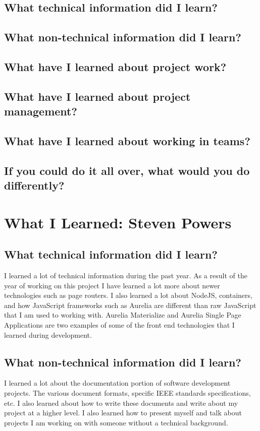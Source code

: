 \documentclass[onecolumn, draftclsnofoot,10pt, compsoc]{IEEEtran}
\begin{document}
\subsection{What technical information did I learn?}

\subsection{What non-technical information did I learn?}

\subsection{What have I learned about project work?}

\subsection{What have I learned about project management?}

\subsection{What have I learned about working in teams?}

\subsection{If you could do it all over, what would you do differently?}


\newpage
\section{What I Learned: Steven Powers}

\subsection{What technical information did I learn?}
I learned a lot of technical information during the past year. As a result of the year of working on this project I have learned a lot more about newer technologies such as page routers. I also learned a lot about NodeJS, containers, and how JavaScript frameworks such as Aurelia are different than raw JavaScript that I am used to working with. Aurelia Materialize and Aurelia Single Page Applications are two examples of some of the front end technologies that I learned during development.

\subsection{What non-technical information did I learn?}
I learned a lot about the documentation portion of software development projects. The various document formats, specific IEEE standards specifications, etc. I also learned about how to write these documents and write about my project at a higher level. I also learned how to present myself and talk about projects I am working on with someone without a technical background.
\end{document}
